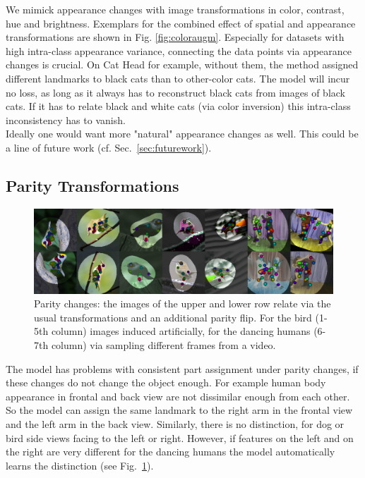 			We mimick appearance changes with image transformations in color, contrast, hue and brightness. Exemplars for the combined effect of spatial and appearance transformations are shown in Fig. \ref{fig:coloraugm}.
			Especially for datasets with high intra-class appearance variance, connecting the data points via appearance changes is crucial. On Cat Head for example, without them, the method assigned different landmarks to black cats than to other-color cats. The model will incur no loss, as long as it always has to reconstruct black cats from images of black cats. If it has to relate black and white cats (\eg via color inversion) this intra-class inconsistency has to vanish.\\
			Ideally one would want more "natural" appearance changes as well. This could be a line of future work (cf. Sec.~\ref{sec:futurework}).


		\subsection{Parity Transformations}\label{sec:parity}
			\begin{figure}[htp]
				\centering
				\includegraphics[trim={0cm 0cm 0cm 0cm},clip, width=1.\linewidth]{fig/shape/parity}
				\caption{Parity changes: the images of the upper and lower row relate via the usual transformations and an additional parity flip. For the bird (1-5th column) images induced artificially, for the dancing humans (6-7th column) via sampling different frames from a video.}
				\label{fig:parity}
			\end{figure}
			The model has problems with consistent part assignment under parity changes, if these changes do not change the object enough. For example human body appearance in frontal and back view are not dissimilar enough from each other. So the model can assign the same landmark to \eg the right arm in the frontal view and the left arm in the back view.
			Similarly, there is no distinction, for dog or bird side views facing to the left or right. However, if features on the left and on the right are very different \eg for the dancing humans the model automatically learns the distinction (see Fig.~\ref{fig:parity}).

